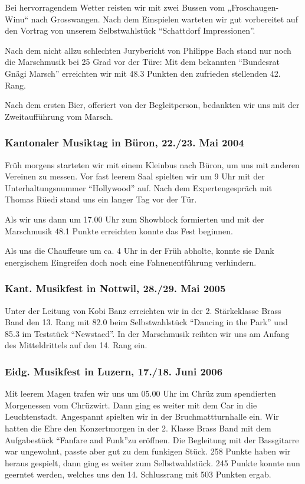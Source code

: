 \begin{history}
    Bei hervorragendem Wetter reisten wir mit zwei Bussen vom „Froschaugen-
    Winu“ nach Grosswangen. Nach dem Einspielen warteten wir gut vorbereitet auf
    den Vortrag von unserem Selbstwahlstück \enquote{Schattdorf Impressionen}.

    Nach dem nicht allzu schlechten Jurybericht von Philippe Bach stand nur noch
    die Marschmusik bei 25 Grad vor der Türe: Mit dem bekannten
    \enquote{Bundesrat Gnägi Marsch} erreichten wir mit 48.3 Punkten den
    zufrieden stellenden 42. Rang.

    Nach dem ersten Bier, offeriert von der Begleitperson, bedankten wir uns mit
    der Zweitaufführung vom Marsch.


    \subsubsection*{Kantonaler Musiktag in Büron, 22./23. Mai 2004}

    Früh morgens starteten wir mit einem Kleinbus nach Büron, um uns mit anderen
    Vereinen zu messen. Vor fast leerem Saal spielten wir um 9 Uhr mit der
    Unterhaltungsnummer \enquote{Hollywood} auf. Nach dem Expertengespräch mit
    Thomas Rüedi stand uns ein langer Tag vor der Tür.

    Als wir uns dann um 17.00 Uhr zum Showblock formierten und mit der
    Marschmusik 48.1 Punkte erreichten konnte das Fest beginnen.

    Als uns die Chauffeuse um ca. 4 Uhr in der Früh abholte, konnte sie Dank
    energischem Eingreifen doch noch eine Fahnenentführung verhindern.


    \subsubsection*{Kant. Musikfest in Nottwil, 28./29. Mai 2005}

    Unter der Leitung von Kobi Banz erreichten wir in der 2. Stärkeklasse Brass
    Band den 13. Rang mit 82.0 beim Selbstwahlstück \enquote{Dancing in the
        Park} und 85.3 im Teststück \enquote{Newstaed}. In der Marschmusik reihten
    wir uns am Anfang des Mitteldrittels auf den 14. Rang ein.


    \subsubsection*{Eidg. Musikfest in Luzern, 17./18. Juni 2006}

    Mit leerem Magen trafen wir uns um 05.00 Uhr im Chrüz zum spendierten
    Morgenessen vom Chrüzwirt. Dann ging es weiter mit dem Car in die
    Leuchtenstadt. Angespannt spielten wir in der Bruchmattturnhalle ein. Wir
    hatten die Ehre den Konzertmorgen in der 2. Klasse Brass Band mit dem
    Aufgabestück \enquote{Fanfare and Funk}zu eröffnen. Die Begleitung mit der
    Bassgitarre war ungewohnt, passte aber gut zu dem funkigen Stück. 258 Punkte
    haben wir heraus gespielt, dann ging es weiter zum Selbstwahlstück. 245
    Punkte konnte nun geerntet werden, welches uns den 14. Schlussrang mit 503
    Punkten ergab.


\end{history}
